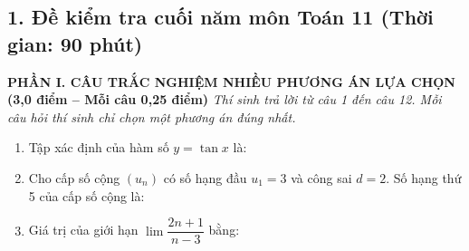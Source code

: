 \documentclass[12pt, a4paper]{article}
\begin{document}
\subsection*{1. Đề kiểm tra cuối năm môn Toán 11 (Thời gian: 90 phút)}

\begin{tcolorbox}[enhanced, colback=white, colframe=blue!70!black, arc=1.5mm, title=\textbf{TRƯỜNG THCS\&THPT HỒNG VÂN -- ĐỀ KIỂM TRA CUỐI NĂM TOÁN 11 (MÃ ĐỀ 101)}]

\textbf{\large PHẦN I. CÂU TRẮC NGHIỆM NHIỀU PHƯƠNG ÁN LỰA CHỌN (3,0 điểm -- Mỗi câu 0,25 điểm)}
\textit{Thí sinh trả lời từ câu 1 đến câu 12. Mỗi câu hỏi thí sinh chỉ chọn một phương án đúng nhất.}

\begin{enumerate}[label=\textbf{Câu \arabic*.}]
    \item Tập xác định của hàm số $y = \tan x$ là:

    \item Cho cấp số cộng $(u_n)$ có số hạng đầu $u_1 = 3$ và công sai $d = 2$. Số hạng thứ 5 của cấp số cộng là:

    \item Giá trị của giới hạn $\lim \dfrac{2n + 1}{n - 3}$ bằng:


\end{enumerate}
\end{tcolorbox}
\end{document}

